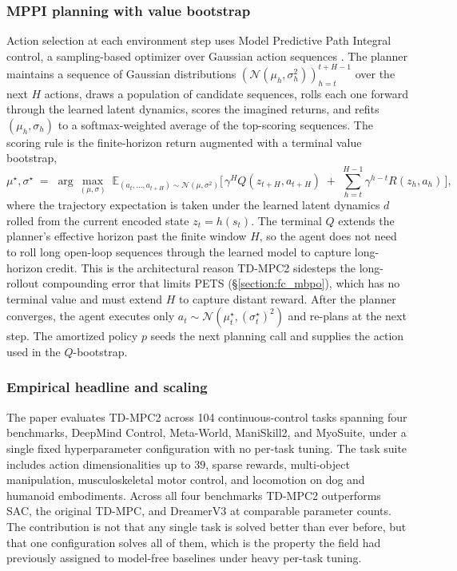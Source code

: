 \subsubsection{MPPI planning with value bootstrap}
\label{section:fc_tdmpc2_mppi}

Action selection at each environment step uses Model Predictive Path Integral control, a sampling-based optimizer over Gaussian action sequences \citep{Hansen2024TDMPC2}. The planner maintains a sequence of Gaussian distributions $(\mathcal{N}(\mu_h, \sigma_h^2))_{h=t}^{t+H-1}$ over the next $H$ actions, draws a population of candidate sequences, rolls each one forward through the learned latent dynamics, scores the imagined returns, and refits $(\mu_h, \sigma_h)$ to a softmax-weighted average of the top-scoring sequences. The scoring rule is the finite-horizon return augmented with a terminal value bootstrap,
\[
  \mu^\star, \sigma^\star \;=\; \arg\max_{(\mu,\sigma)} \;\mathbb{E}_{(a_t, \ldots, a_{t+H}) \sim \mathcal{N}(\mu, \sigma^2)} \Big[\, \gamma^{H} Q(z_{t+H}, a_{t+H}) \;+\; \sum_{h=t}^{H-1} \gamma^{h-t} R(z_h, a_h) \,\Big],
\]
where the trajectory expectation is taken under the learned latent dynamics $d$ rolled from the current encoded state $z_t = h(s_t)$. The terminal $Q$ extends the planner's effective horizon past the finite window $H$, so the agent does not need to roll long open-loop sequences through the learned model to capture long-horizon credit. This is the architectural reason TD-MPC2 sidesteps the long-rollout compounding error that limits PETS (\S\ref{section:fc_mbpo}), which has no terminal value and must extend $H$ to capture distant reward. After the planner converges, the agent executes only $a_t \sim \mathcal{N}(\mu_t^\star, (\sigma_t^\star)^2)$ and re-plans at the next step. The amortized policy $p$ seeds the next planning call and supplies the action used in the $Q$-bootstrap.

\subsubsection{Empirical headline and scaling}
\label{section:fc_tdmpc2_empirics}

The paper evaluates TD-MPC2 across 104 continuous-control tasks spanning four benchmarks, DeepMind Control, Meta-World, ManiSkill2, and MyoSuite, under a single fixed hyperparameter configuration with no per-task tuning. The task suite includes action dimensionalities up to $39$, sparse rewards, multi-object manipulation, musculoskeletal motor control, and locomotion on dog and humanoid embodiments. Across all four benchmarks TD-MPC2 outperforms SAC, the original TD-MPC, and DreamerV3 at comparable parameter counts. The contribution is not that any single task is solved better than ever before, but that one configuration solves all of them, which is the property the field had previously assigned to model-free baselines under heavy per-task tuning.

